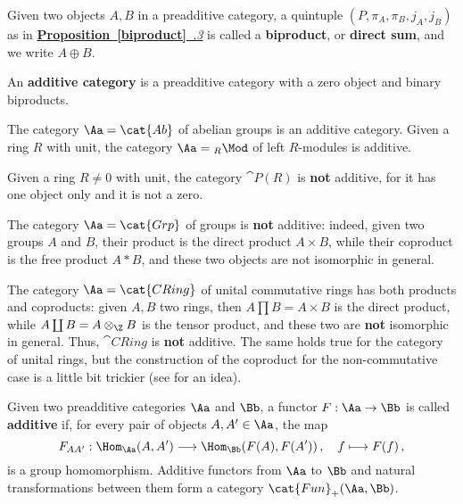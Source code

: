 \begin{df}
    Given two objects $A,B$ in a preadditive category, 
    a quintuple 
    $(P,\pi_{A}, \pi_{B}, j_{A}, j_{B})$ as in 
    \hyperref[biproduct]{\textbf{Proposition~\ref*{biproduct}}~\emph{.3}}
    is called a \textbf{biproduct}, or \textbf{direct sum},
    and we write $A \oplus B$.
\end{df}

\begin{df}
    An \textbf{additive category} is a preadditive category with
    a zero object and binary biproducts.
\end{df}

\begin{ex}
    The category $\Aa = \cat{Ab}$ of abelian groups is an additive
    category. Given a ring $R$ with unit, the category $\Aa = {}_{R}\Mod$ 
    of left $R$-modules is additive.
\end{ex}

\begin{ex}
    Given a ring $R \ne 0$ with unit, the category
    $\cat{P}(R)$ is \textbf{not} additive, 
    for it has one object only and it is not a zero.
\end{ex}

\begin{ex}
    The category $\Aa = \cat{Grp}$ of groups is \textbf{not} additive:
    indeed, given two groups $A$ and $B$, their product is the
    direct product $A \times B$, while their coproduct is the
    free product $A \ast B$, and these two objects
    are not isomorphic in general.
\end{ex}

\begin{ex}
    The category $\Aa = \cat{CRing}$ 
    of unital commutative rings
    has both products and coproducts: 
    given $A,B$ two rings,
    then $A \prod B = A \times B$ is the direct product,
    while $A \coprod B = A \otimes_{\Z} B$ is the tensor
    product, and these two are \textbf{not} isomorphic in general.
    Thus, $\cat{CRing}$ is \textbf{not} additive.
    The same holds true for the category of unital rings,
    but the construction of the coproduct for
    the non-commutative case is a little bit trickier
    (see \parencite{coprod-rings} for an idea).
\end{ex}

\begin{df}
    Given two preadditive categories $\Aa$ and $\Bb$,
    a functor $F: \Aa \to \Bb$ is called \textbf{additive} 
    if, for every pair of objects $A,A' \in \Aa$,
    the map
    \begin{equation*}
       F_{AA'} : \Hom_{\Aa}(A,A') \longrightarrow \Hom_{\Bb}(F(A),F(A'))\,,
       \quad f \longmapsto F(f)\,,
    \end{equation*}
    is a group homomorphism. 
    Additive functors from $\Aa$ to $\Bb$ and
    natural transformations between them
    form a category $\cat{Fun}_{+}(\Aa,\Bb)$.
\end{df}

